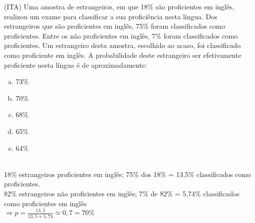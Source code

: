 \begin{ex}
  (ITA) Uma amostra de estrangeiros, em que 18\% são proficientes em inglês, realizou um exame para classificar a sua proficiência nesta língua. Dos estrangeiros que são proficientes em inglês, 75\% foram classificados como proficientes. Entre os não proficientes em inglês, 7\% foram classificados como proficientes. Um estrangeiro desta amostra, escolhido ao acaso, foi classificado como proficiente em inglês. A probabilidade deste estrangeiro ser efetivamente proficiente nesta língua é de aproximadamente:
    \begin{enumerate}[(a)]
    \item 73\%
    \item 70\%
    \item 68\%
    \item 65\%
    \item 64\%
    \end{enumerate}
      \begin{sol}
        \phantom{A} \\
        18\% estrangeiros proficientes em inglês;  75\% dos 18\% = 13,5\%  classificados como proficientes.\\
        82\% estrangeiros não proficientes em inglês;  7\% de 82\% = 5,74\%  classificados como proficientes em inglês\\
        $\Longrightarrow p = \frac{13,5}{13,5+5,74}\simeq0,7 = 70\%$
      \end{sol}
\end{ex}
